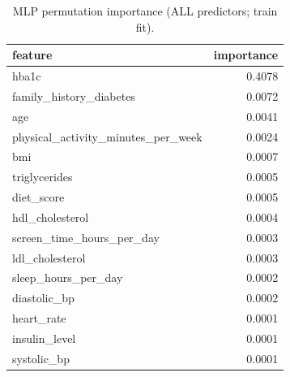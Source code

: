 \begin{table}[H]
\begin{center}
\begin{tabular}{lr}
\toprule
feature & importance \\
\midrule
hba1c & 0.4078 \\
family\_history\_diabetes & 0.0072 \\
age & 0.0041 \\
physical\_activity\_minutes\_per\_week & 0.0024 \\
bmi & 0.0007 \\
triglycerides & 0.0005 \\
diet\_score & 0.0005 \\
hdl\_cholesterol & 0.0004 \\
screen\_time\_hours\_per\_day & 0.0003 \\
ldl\_cholesterol & 0.0003 \\
sleep\_hours\_per\_day & 0.0002 \\
diastolic\_bp & 0.0002 \\
heart\_rate & 0.0001 \\
insulin\_level & 0.0001 \\
systolic\_bp & 0.0001 \\
\bottomrule
\end{tabular}
\end{center}
\vspace{-5pt}
\caption{MLP permutation importance (ALL predictors; train fit).}
\label{tab:mlp_perm_importance_all}
\end{table}
